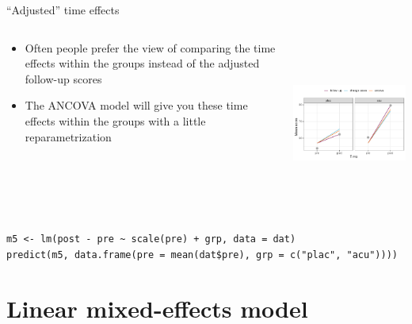 \documentclass[aspectratio=169]{beamer}
\begin{document}
\begin{frame}[fragile]{``Adjusted'' time effects}
  \begin{columns}
    \begin{column}{.4\textwidth}
      \begin{itemize}
        \item Often people prefer the view of comparing the time effects within
          the groups instead of the adjusted follow-up scores
        \item The ANCOVA model will give you these time effects within the
          groups with a little reparametrization
      \end{itemize}
    \end{column}
    \begin{column}{.6\textwidth}
      \includegraphics[height=5.5cm]{../figures/acu-timeeffects}
    \end{column}
  \end{columns}
\begin{lstlisting}
m5 <- lm(post - pre ~ scale(pre) + grp, data = dat)
predict(m5, data.frame(pre = mean(dat$pre), grp = c("plac", "acu"))))
\end{lstlisting}
\end{frame}

\appendix

\section{Linear mixed-effects model}
\end{document}
